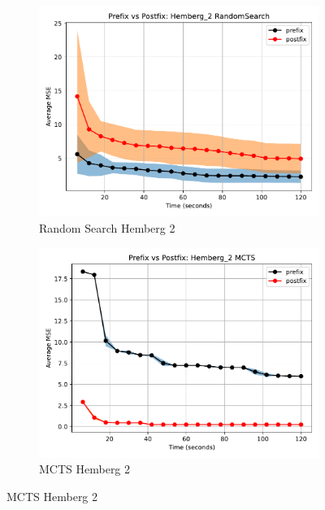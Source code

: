 \documentclass[12pt]{iopart}
\begin{document}
\begin{figure}
    \centering
    
    \begin{subfigure}[b]{0.4\textwidth}
        \includegraphics[width=\linewidth, keepaspectratio]{Hemberg_Benchmarks/PrePostHemberg_2RandomSearch.pdf}
        \caption{Random Search Hemberg 2}
        \label{subfig:hemberg_2_RS}
    \end{subfigure}
    \begin{subfigure}[b]{0.4\textwidth}
        \includegraphics[width=\linewidth, keepaspectratio]{Hemberg_Benchmarks/PrePostHemberg_2MCTS.pdf}
        \caption{MCTS Hemberg 2}
        \label{subfig:hemberg_2_MCTS}
    \end{subfigure}
    

\end{figure}
\end{document}
